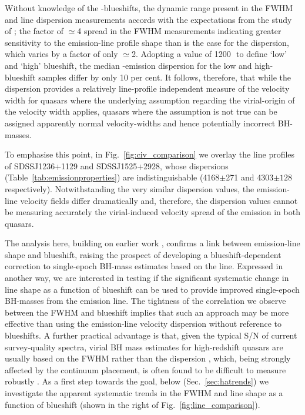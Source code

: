 Without knowledge of the -blueshifts, the dynamic range present in the FWHM and line dispersion measurements accords with the expectations from the study of \citet{denney13}; the factor of $\simeq$4 spread in the FWHM measurements indicating greater sensitivity to the emission-line profile shape than is the case for the dispersion, which varies by a factor of only $\simeq$2. 
Adopting a value of 1200\,\kms\, to define `low' and `high' blueshift, the median -emission dispersion for the low and high-blueshift samples differ by only 10 per cent. 
It follows, therefore, that while the dispersion provides a relatively line-profile independent measure of the velocity width for quasars where the underlying assumption regarding the virial-origin of the velocity width applies, quasars where the assumption is not true can be assigned apparently normal velocity-widths and hence potentially incorrect BH-masses. 

To emphasise this point, in Fig.~\ref{fig:civ_comparison} we overlay the  line profiles of SDSSJ1236+1129 and SDSSJ1525+2928, whose dispersions (Table~\ref{tab:emissionproperties}) are indistinguishable (4168$\pm$271 and 4303$\pm128$\,\kms respectively). 
Notwithstanding the very similar dispersion values, the emission-line velocity fields differ dramatically and, therefore, the dispersion values cannot be measuring accurately the virial-induced velocity spread of the  emission in both quasars.

The analysis here, building on earlier work \citep[including][]{shen12, sulentic07}, confirms a link between  emission-line shape and blueshift, raising the prospect of developing a blueshift-dependent correction to single-epoch BH-mass estimates based on the  line. 
Expressed in another way, we are interested in testing if the significant systematic change in line shape as a function of  blueshift can be used to provide improved single-epoch BH-masses from the  emission line.  
The tightness of the correlation we observe between the  FWHM and blueshift implies that such an approach may be more effective than using the  emission-line velocity dispersion without reference to blueshifts.
A further practical advantage is that, given the typical S/N of current survey-quality spectra, virial BH mass estimates for high-redshift quasars are usually based on the FWHM rather than the dispersion \citep[e.g.][]{shen11}, which, being strongly affected by the continuum placement, is often found to be difficult to measure robustly \citep[e.g.][]{mejia-restrepo16}. 
As a first step towards the goal, below (Sec.~\ref{sec:hatrends}) we investigate the apparent systematic trends in the \ha FWHM and line shape as a function of  blueshift (shown in the right of Fig.~\ref{fig:line_comparison}).

